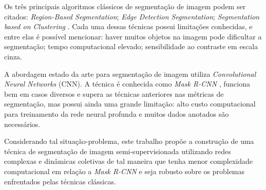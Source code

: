 Os três principais algoritmos clássicos de segmentação de imagem podem
ser citados: \textit{Region-Based Segmentation}; \textit{Edge Detection
  Segmentation}; \textit{Segmentation based on Clustering}
\cite{ImageSegmentationTechniques1985}. Cada uma dessas técnicas
possui limitações conhecidas, e entre elas é possível mencionar: haver
muitos objetos na imagem pode dificultar a segmentação; tempo
computacional elevado; sensibilidade ao contraste em escala cinza.

A abordagem estado da arte para segmentação de imagem utiliza
\textit{Convolutional Neural Networks} (CNN). A técnica é conhecida
como \textit{Mask R-CNN} \cite{he2018mask}, funciona bem em casos
diversos e supera as técnicas anteriores nas métricas de segmentação,
mas possui ainda uma grande limitação: alto custo computacional para
treinamento da rede neural profunda e muitos dados anotados são necessários.

Considerando tal situação-problema, este trabalho propõe a construção
de uma técnica de segmentação de imagem semi-supervisionada utilizando
redes complexas e dinâmicas coletivas de tal maneira que tenha menor
complexidade computacional em relação a \textit{Mask R-CNN} e seja
robusto sobre os problemas enfrentados pelas técnicas clássicas.
